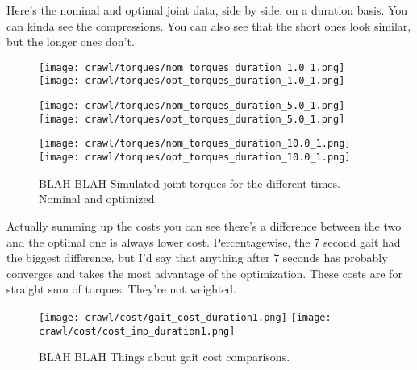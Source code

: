 Here's the nominal and optimal joint data, side by side, on a duration basis.
You can kinda see the compressions. You can also see that the short ones look similar,
but the longer ones don't.

\begin{figure}
  \centerline{
    \texttt{[image: crawl/torques/nom\_torques\_duration\_1.0\_1.png]}
    \texttt{[image: crawl/torques/opt\_torques\_duration\_1.0\_1.png]}
  }
  \centerline{
    \texttt{[image: crawl/torques/nom\_torques\_duration\_5.0\_1.png]}
    \texttt{[image: crawl/torques/opt\_torques\_duration\_5.0\_1.png]}
  }
  \centerline{
    \texttt{[image: crawl/torques/nom\_torques\_duration\_10.0\_1.png]}
    \texttt{[image: crawl/torques/opt\_torques\_duration\_10.0\_1.png]}
  }
  \caption{BLAH BLAH Simulated joint torques for the different times. Nominal and optimized.}
  \label{fig:vrep_joint_torques_by_duration1}
\end{figure}

Actually summing up the costs you can see there's a difference between the two and the optimal
one is always lower cost.
Percentagewise, the 7 second gait had the biggest difference, but I'd say that anything after
7 seconds has probably converges and takes the most advantage of the optimization.
These costs are for straight sum of torques. They're not weighted.

\begin{figure}
  \texttt{[image: crawl/cost/gait\_cost\_duration1.png]}
  \texttt{[image: crawl/cost/cost\_imp\_duration1.png]}
  \caption{BLAH BLAH Things about gait cost comparisons.}
  \label{fig:cost_duration1}
\end{figure}


